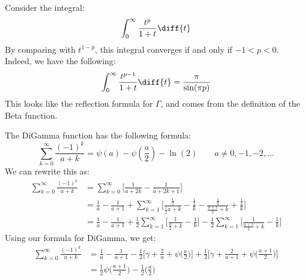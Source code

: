 \documentclass[crop=false,class=book,oneside]{standalone}
\begin{document}
        \begin{lexample}
            Consider the integral:
            \begin{equation}
                \int_{0}^{\infty}\frac{t^{p}}{1+t}\diff{t}
            \end{equation}
            By comparing with $t^{1-p}$, this integral
            converges if and only if $\minus{1}<p<0$.
            Indeed, we have the following:
            \begin{equation}
                \int_{0}^{\infty}\frac{t^{p-1}}{1+t}\diff{t}
                =\frac{\pi}{\sin(\pi{p})}
            \end{equation}
            This looks like the reflection formula for $\Gamma$,
            and comes from the definition of the Beta function.
        \end{lexample}
        The DiGamma function has the following formula:
        \begin{equation}
            \sum_{k=0}^{\infty}\frac{(\minus{1})^{k}}{a+k}
            =\psi(a)-\psi(\frac{a}{2})-\ln(2)
            \quad\quad
            a\ne{0},\minus{1},\minus{2},\dots
        \end{equation}
        We can rewrite this as:
        \begin{subequations}
            \begin{align}
                \sum_{k=0}^{\infty}\frac{(\minus{1})^{k}}{a+k}
                &=\sum_{k=0}^{\infty}\Big[
                    \frac{1}{a+2k}-\frac{1}{a+2k+1}\Big]\\
                &=\frac{1}{a}-\frac{1}{a+1}+\sum_{k=1}^{\infty}\Big[
                    \frac{\frac{1}{2}}{\frac{1}{2}a+k}-
                    \frac{\frac{1}{2}}{k}-
                    \frac{\frac{1}{2}}{\frac{a+1}{2}+k}+
                    \frac{\frac{1}{2}}{k}\Big]\\
                &=\frac{1}{a}-\frac{1}{a+1}+
                    \frac{1}{2}\sum_{k=1}^{\infty}\Big[
                        \frac{1}{\frac{a}{2}+k}-\frac{1}{k}\Big]-
                    \frac{1}{2}\sum_{k=1}^{\infty}\Big[
                        \frac{1}{\frac{a+1}{2}+k}-\frac{1}{k}\Big]
            \end{align}
        \end{subequations}
        Using our formula for DiGamma, we get:
        \begin{subequations}
            \begin{align}
                \sum_{k=0}^{\infty}\frac{(\minus{1})^{k}}{a+k}
                &=\frac{1}{a}-\frac{1}{a+1}-\frac{1}{2}\Big[
                    \gamma+\frac{2}{a}+\psi\big(\frac{a}{2}\big)\Big]+
                    \frac{1}{2}\Big[
                        \gamma+\frac{2}{a+1}+
                        \psi\big(\frac{a+1}{2}\big)
                    \Big]\\
                &=\frac{1}{2}\psi\big(\frac{a+1}{2}\big)-
                    \frac{1}{2}\big(\frac{a}{2}\big)
            \end{align}
        \end{subequations}
\end{document}
